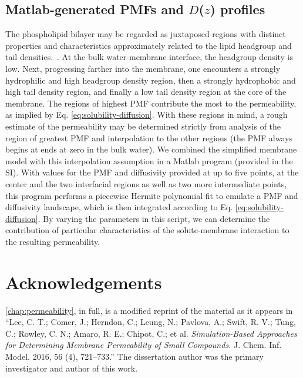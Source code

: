 \subsection{Matlab-generated PMFs and $D$($z$) profiles}
\par The phospholipid bilayer may be regarded as juxtaposed regions with distinct properties and characteristics approximately related to the lipid headgroup and tail densities.~\cite{Marrink1994}. At the bulk water-membrane interface, the headgroup density is low. Next, progressing farther into the membrane, one encounters a strongly hydrophilic and high headgroup density region, then a strongly hydrophobic and high tail density region, and finally a low tail density region at the core of the membrane. The regions of highest PMF contribute the most to the permeability, as implied by Eq. \ref{eq:solubility-diffusion}. With these regions in mind, a rough estimate of the permeability may be determined strictly from analysis of the region of greatest PMF and interpolation to the other regions (the PMF always begins at ends at zero in the bulk water). We combined the simplified membrane model with this interpolation assumption in a Matlab program (provided in the SI). With values for the PMF and diffusivity provided at up to five points, at the center and the two interfacial regions as well as two more intermediate points, this program performs a piecewise Hermite polynomial fit to emulate a PMF and diffusivity landscape, which is then integrated according to Eq. \ref{eq:solubility-diffusion}. By varying the parameters in this script, we can determine the contribution of particular characteristics of the solute-membrane interaction to the resulting permeability.

\section{Acknowledgements}
\par \cref{chap:permeability}, in full, is a modified reprint of the material as it appears in ``Lee, C. T.; Comer, J.; Herndon, C.; Leung, N.; Pavlova, A.; Swift, R. V.; Tung, C.; Rowley, C. N.; Amaro, R. E.; Chipot, C.; et al. \emph{Simulation-Based Approaches for Determining Membrane Permeability of Small Compounds.} J. Chem. Inf. Model. 2016, 56 (4), 721–733.''
The dissertation author was the primary investigator and author of this work.


